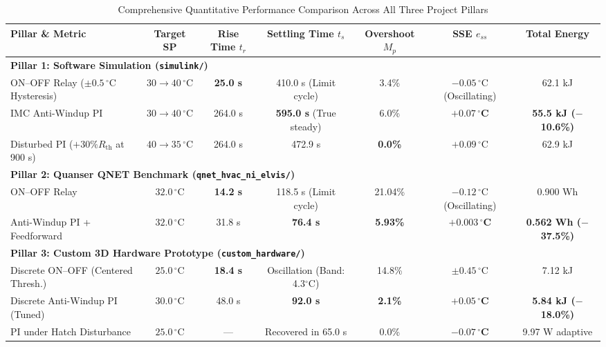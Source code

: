 \documentclass[conference]{IEEEtran}
\begin{document}
\begin{table}[htbp]
\caption{Comprehensive Quantitative Performance Comparison Across All Three Project Pillars}
\label{tab:master_benchmark}
\centering
\begin{tabular}{@{}lcccccc@{}}
\toprule
\textbf{Pillar \& Metric} & \textbf{Target SP} & \textbf{Rise Time $t_r$} & \textbf{Settling Time $t_s$} & \textbf{Overshoot $M_p$} & \textbf{SSE $e_{ss}$} & \textbf{Total Energy} \\ \midrule
\multicolumn{7}{l}{\textbf{Pillar 1: Software Simulation (\texttt{simulink/})}} \\
ON--OFF Relay ($\pm 0.5\,^\circ\text{C}$ Hysteresis) & $30 \to 40\,^\circ\text{C}$ & \textbf{25.0 s} & 410.0 s (Limit cycle) & 3.4\% & $-0.05\,^\circ\text{C}$ (Oscillating) & 62.1 kJ \\
IMC Anti-Windup PI & $30 \to 40\,^\circ\text{C}$ & 264.0 s & \textbf{595.0 s} (True steady) & 6.0\% & $\mathbf{+0.07\,^\circ\text{C}}$ & \textbf{55.5 kJ ($-$10.6\%)} \\
Disturbed PI ($+30\% R_\text{th}$ at 900 s) & $40 \to 35\,^\circ\text{C}$ & 264.0 s & 472.9 s & \textbf{0.0\%} & $+0.09\,^\circ\text{C}$ & 62.9 kJ \\ \midrule
\multicolumn{7}{l}{\textbf{Pillar 2: Quanser QNET Benchmark (\texttt{qnet\_hvac\_ni\_elvis/})}} \\
ON--OFF Relay & $32.0\,^\circ\text{C}$ & \textbf{14.2 s} & 118.5 s (Limit cycle) & 21.04\% & $-0.12\,^\circ\text{C}$ (Oscillating) & 0.900 Wh \\
Anti-Windup PI + Feedforward & $32.0\,^\circ\text{C}$ & 31.8 s & \textbf{76.4 s} & \textbf{5.93\%} & $\mathbf{+0.003\,^\circ\text{C}}$ & \textbf{0.562 Wh ($-$37.5\%)} \\ \midrule
\multicolumn{7}{l}{\textbf{Pillar 3: Custom 3D Hardware Prototype (\texttt{custom\_hardware/})}} \\
Discrete ON--OFF (Centered Thresh.) & $25.0\,^\circ\text{C}$ & \textbf{18.4 s} & Oscillation (Band: 4.3$^\circ\text{C}$) & 14.8\% & $\pm 0.45\,^\circ\text{C}$ & 7.12 kJ \\
Discrete Anti-Windup PI (Tuned) & $30.0\,^\circ\text{C}$ & 48.0 s & \textbf{92.0 s} & \textbf{2.1\%} & $\mathbf{+0.05\,^\circ\text{C}}$ & \textbf{5.84 kJ ($-$18.0\%)} \\
PI under Hatch Disturbance & $25.0\,^\circ\text{C}$ & --- & Recovered in 65.0 s & 0.0\% & $\mathbf{-0.07\,^\circ\text{C}}$ & 9.97 W adaptive \\ \bottomrule
\end{tabular}
\end{table}
\end{document}
